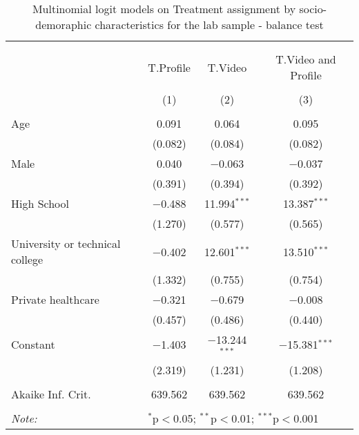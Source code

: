 
\begin{table}[H] \centering 
  \caption{Multinomial logit models on Treatment assignment by socio-demoraphic characteristics for the lab sample - balance test} 
  \label{tbl:balance_Lab} 
\begin{tabular}{@{\extracolsep{5pt}}lccc} 
\\[-1.8ex]\hline 
\hline \\[-1.8ex] 
\\[-1.8ex] & T.Profile & T.Video & T.Video and Profile \\ 
\\[-1.8ex] & (1) & (2) & (3)\\ 
\hline \\[-1.8ex] 
 Age & 0.091 & 0.064 & 0.095 \\ 
  & (0.082) & (0.084) & (0.082) \\ 
  Male & 0.040 & $-$0.063 & $-$0.037 \\ 
  & (0.391) & (0.394) & (0.392) \\ 
  High School & $-$0.488 & 11.994$^{***}$ & 13.387$^{***}$ \\ 
  & (1.270) & (0.577) & (0.565) \\ 
  University or technical college & $-$0.402 & 12.601$^{***}$ & 13.510$^{***}$ \\ 
  & (1.332) & (0.755) & (0.754) \\ 
  Private healthcare & $-$0.321 & $-$0.679 & $-$0.008 \\ 
  & (0.457) & (0.486) & (0.440) \\ 
  Constant & $-$1.403 & $-$13.244$^{***}$ & $-$15.381$^{***}$ \\ 
  & (2.319) & (1.231) & (1.208) \\ 
 \hline \\[-1.8ex] 
Akaike Inf. Crit. & 639.562 & 639.562 & 639.562 \\ 
\hline 
\hline \\[-1.8ex] 
\textit{Note:}  & \multicolumn{3}{l}{$^{*}$p$<$0.05; $^{**}$p$<$0.01; $^{***}$p$<$0.001} \\ 
\end{tabular} 
\end{table} 
